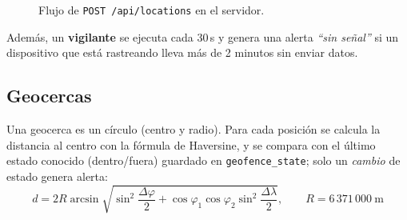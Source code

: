 \documentclass[11pt]{article}
\begin{document}
\begin{figure}[!htbp]
\centering
{}
\caption{Flujo de \texttt{POST /api/locations} en el servidor.}
\end{figure}

Además, un \textbf{vigilante} se ejecuta cada 30\,s y genera una alerta \emph{``sin señal''} si un
dispositivo que está rastreando lleva más de 2 minutos sin enviar datos.

\subsection{Geocercas}
Una geocerca es un círculo (centro y radio). Para cada posición se calcula la distancia al centro con la
fórmula de Haversine, y se compara con el último estado conocido (dentro/fuera) guardado en
\texttt{geofence\_state}; solo un \emph{cambio} de estado genera alerta:
\begin{equation}
  d = 2R \arcsin\sqrt{\sin^2\!\frac{\Delta\varphi}{2} + \cos\varphi_1\cos\varphi_2\sin^2\!\frac{\Delta\lambda}{2}},
  \qquad R = 6\,371\,000\ \text{m}
\end{equation}
\end{document}
